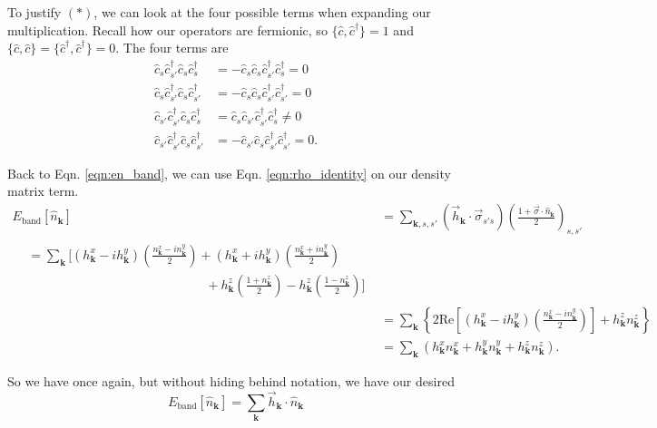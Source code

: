 \documentclass[12pt]{revtex4-2}
\newcommand{\real}{\text{Re}}
\begin{document}
To justify $(*)$, we can look at the four possible terms when expanding our multiplication.  Recall how our operators are fermionic, so $\{\hat{c},\hat{c}^\dagger\}=1$ and $\{\hat{c},\hat{c}\} = \{\hat{c}^\dagger,\hat{c}^\dagger\}=0$.  The four terms are
\begin{align}
    \hat{c}_s \hat{c}_{s'}^\dagger \hat{c}_s \hat{c}_s^\dagger &= -\hat{c}_s \hat{c}_s \hat{c}_{s'}^\dagger \hat{c}_s^\dagger = 0 \\
    \hat{c}_s \hat{c}_{s'}^\dagger \hat{c}_s \hat{c}_{s'}^\dagger &= -\hat{c}_s \hat{c}_s \hat{c}_{s'}^\dagger \hat{c}_{s'}^\dagger = 0 \\
    \hat{c}_{s'} \hat{c}_{s'}^\dagger \hat{c}_s \hat{c}_s^\dagger &= \hat{c}_s \hat{c}_{s'} \hat{c}_{s'}^\dagger \hat{c}_s^\dagger \neq 0 \\
    \hat{c}_{s'} \hat{c}_{s'}^\dagger \hat{c}_s \hat{c}_{s'}^\dagger &= -\hat{c}_{s'} \hat{c}_s \hat{c}_{s'}^\dagger \hat{c}_{s'}^\dagger = 0.
\end{align}

Back to Eqn. \ref{eqn:en_band}, we can use Eqn. \ref{eqn:rho_identity} on our density matrix term.
\begin{align}
    E_\text{band}[\hat{n}_\mathbf{k}] &= \sum_{\mathbf{k},s,s'} (\vec{h}_\mathbf{k} \cdot \vec{\sigma}_{s's}) \left( \frac{1 + \vec{\sigma} \cdot \hat{n}_\mathbf{k}}{2} \right)_{s,s'} \\
    \begin{split}
        &= \sum_\mathbf{k} \bigg[ (h_\mathbf{k}^x - ih_\mathbf{k}^y)\left(\frac{n_\mathbf{k}^x - in_\mathbf{k}^y}{2}\right) + (h_\mathbf{k}^x + ih_\mathbf{k}^y)\left(\frac{n_\mathbf{k}^x + in_\mathbf{k}^y}{2}\right) \\
        &\qquad\qquad\qquad\qquad\qquad\qquad\qquad + h_\mathbf{k}^z\left( \frac{1 + n_\mathbf{k}^z}{2} \right) - h_\mathbf{k}^z\left( \frac{1 - n_\mathbf{k}^z}{2} \right) \bigg]
    \end{split} \\
    &= \sum_\mathbf{k}\left\{ 2\real\left[ (h_\mathbf{k}^x - ih_\mathbf{k}^y)\left(\frac{n_\mathbf{k}^x - in_\mathbf{k}^y}{2}\right) \right] + h_\mathbf{k}^z n_\mathbf{k}^z \right\} \\
    &= \sum_{\mathbf{k}} \left( h_\mathbf{k}^xn_\mathbf{k}^x + h_\mathbf{k}^yn_\mathbf{k}^y + h_\mathbf{k}^z n_\mathbf{k}^z \right).
\end{align}

So we have once again, but without hiding behind notation, we have our desired
\begin{equation}
    \boxed{ E_\text{band}[\hat{n}_\mathbf{k}] = \sum_{\mathbf{k}} \vec{h}_\mathbf{k} \cdot \hat{n}_\mathbf{k} }
\end{equation}
\end{document}
